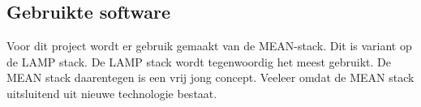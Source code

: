 \documentclass[a4paper,11pt]{article}
\begin{document}
\subsection{Gebruikte software}
%
%
%

Voor dit project wordt er gebruik gemaakt van de MEAN-stack. Dit is variant op de LAMP stack. De LAMP stack wordt tegenwoordig het meest gebruikt. De MEAN stack daarentegen is een vrij jong concept. Veeleer omdat de MEAN stack uitsluitend uit nieuwe technologie bestaat.
\end{document}
